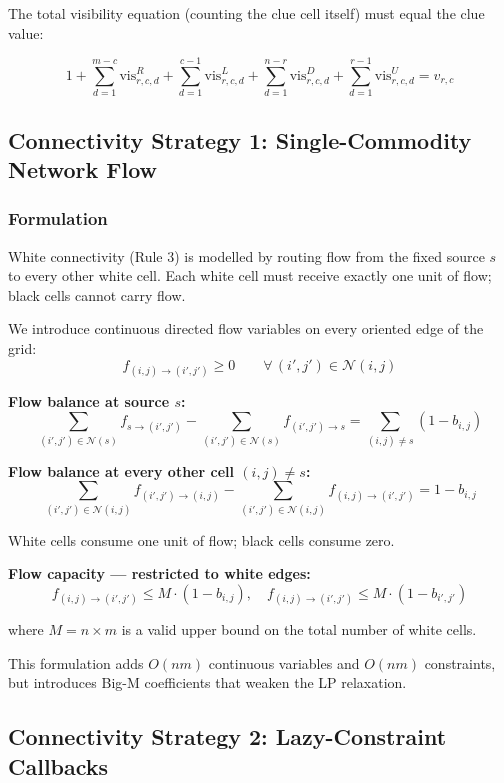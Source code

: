 The total visibility equation (counting the clue cell itself) must equal the clue value:

\begin{equation}
  1 + \sum_{d=1}^{m-c} \text{vis}^{R}_{r,c,d}
    + \sum_{d=1}^{c-1} \text{vis}^{L}_{r,c,d}
    + \sum_{d=1}^{n-r} \text{vis}^{D}_{r,c,d}
    + \sum_{d=1}^{r-1} \text{vis}^{U}_{r,c,d}
  = v_{r,c}
  \tag{R4c}
\end{equation}

\subsection{Connectivity Strategy 1: Single-Commodity Network Flow}
\label{sec:flow}

\subsubsection{Formulation}

White connectivity (Rule 3) is modelled by routing flow from the fixed source $s$ to every other white cell. Each white cell must receive exactly one unit of flow; black cells cannot carry flow.

We introduce continuous directed flow variables on every oriented edge of the grid:
\[
  f_{(i,j) \to (i',j')} \geq 0 \qquad \forall\, (i',j') \in \mathcal{N}(i,j)
\]

\textbf{Flow balance at source $s$:}
\[
  \sum_{(i',j') \in \mathcal{N}(s)} f_{s \to (i',j')} - \sum_{(i',j') \in \mathcal{N}(s)} f_{(i',j') \to s}
  = \sum_{(i,j) \neq s} (1 - b_{i,j})
  \tag{R3a}
\]

\textbf{Flow balance at every other cell $(i,j) \neq s$:}
\[
  \sum_{(i',j') \in \mathcal{N}(i,j)} f_{(i',j') \to (i,j)} - \sum_{(i',j') \in \mathcal{N}(i,j)} f_{(i,j) \to (i',j')}
  = 1 - b_{i,j}
  \tag{R3b}
\]

White cells consume one unit of flow; black cells consume zero.

\textbf{Flow capacity — restricted to white edges:}
\[
  f_{(i,j) \to (i',j')} \leq M \cdot (1 - b_{i,j}), \quad
  f_{(i,j) \to (i',j')} \leq M \cdot (1 - b_{i',j'})
  \tag{R3c}
\]

where $M = n \times m$ is a valid upper bound on the total number of white cells.

This formulation adds $O(nm)$ continuous variables and $O(nm)$ constraints, but introduces Big-M coefficients that weaken the LP relaxation.

\subsection{Connectivity Strategy 2: Lazy-Constraint Callbacks}
\label{sec:callback}

